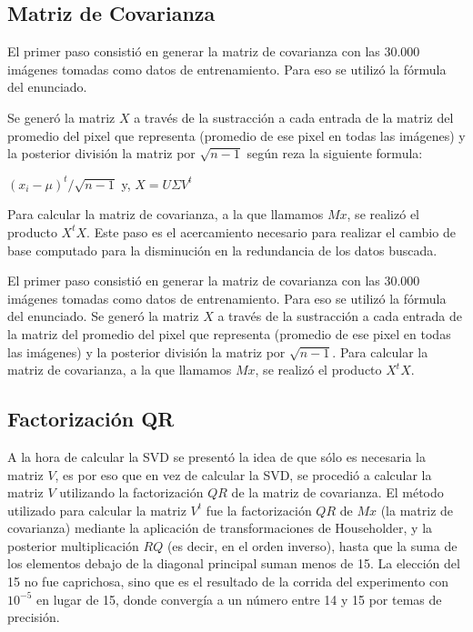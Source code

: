 \subsection{Matriz de Covarianza}

El primer paso consisti\'o en generar la matriz de covarianza con las 30.000
im\'agenes tomadas como datos de entrenamiento. Para eso se utiliz\'o la f\'ormula del enunciado.

Se gener\'o la matriz $X$ a trav\'es de la sustracci\'on a cada entrada de la 
matriz del promedio del pixel que representa (promedio de ese pixel en todas las 
im\'agenes) y la posterior divisi\'on la matriz por $\sqrt{n-1}$ seg\'un reza la
siguiente formula:
\\

\centerline{$(x_i - \mu)^{t}/\sqrt{n-1}$ y, $X=U \Sigma V^t$}
\bigskip
Para calcular la matriz de covarianza, a la que llamamos $Mx$, se realiz\'o el
producto $X^tX$. Este paso es el acercamiento necesario para realizar el cambio
de base computado para la disminuci\'on en la redundancia de los datos buscada.

El primer paso consisti\'o en generar la matriz de covarianza con las 30.000
im\'agenes tomadas como datos de entrenamiento. Para eso se utiliz\'o la f\'ormula del enunciado. 
Se gener\'o la matriz $X$ a trav\'es de la sustracci\'on a cada entrada de la
matriz del promedio del pixel que representa (promedio de ese pixel en todas las im\'agenes) 
y la posterior divisi\'on la matriz por $\sqrt{n-1}$. Para calcular la
matriz de covarianza, a la que llamamos $Mx$, se realiz\'o el producto $X^tX$.

\subsection{Factorizaci\'on QR}
A la hora de calcular la SVD se present\'o la idea de que s\'olo es necesaria la matriz $V$, es por
eso que en vez de calcular la SVD, se procedi\'o a calcular la matriz $V$ utilizando la factorizaci\'on
$QR$ de la matriz de covarianza. El m\'etodo utilizado para calcular la matriz $V^t$ fue la factorizaci\'on
$QR$ de $Mx$ (la matriz de covarianza) mediante la aplicaci\'on de transformaciones de Householder, y la
posterior multiplicaci\'on $RQ$ (es decir, en el orden inverso), hasta que la suma de los elementos debajo
de la diagonal principal suman menos de 15. La elecci\'on del 15 no fue caprichosa, sino que es el
resultado de la corrida del experimento con $10^{-5}$ en lugar de 15, donde converg\'ia a un n\'umero
entre 14 y 15 por temas de precisi\'on.


